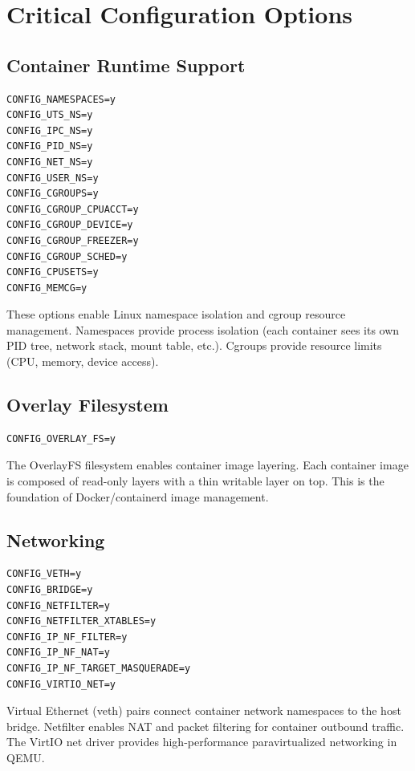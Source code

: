 \section{Critical Configuration Options}

\subsection{Container Runtime Support}

\begin{lstlisting}
CONFIG_NAMESPACES=y
CONFIG_UTS_NS=y
CONFIG_IPC_NS=y
CONFIG_PID_NS=y
CONFIG_NET_NS=y
CONFIG_USER_NS=y
CONFIG_CGROUPS=y
CONFIG_CGROUP_CPUACCT=y
CONFIG_CGROUP_DEVICE=y
CONFIG_CGROUP_FREEZER=y
CONFIG_CGROUP_SCHED=y
CONFIG_CPUSETS=y
CONFIG_MEMCG=y
\end{lstlisting}

These options enable Linux namespace isolation and cgroup resource
management. Namespaces provide process isolation (each container sees
its own PID tree, network stack, mount table, etc.). Cgroups provide
resource limits (CPU, memory, device access).

\subsection{Overlay Filesystem}

\begin{lstlisting}
CONFIG_OVERLAY_FS=y
\end{lstlisting}

The OverlayFS filesystem enables container image layering. Each container
image is composed of read-only layers with a thin writable layer on top.
This is the foundation of Docker/containerd image management.

\subsection{Networking}

\begin{lstlisting}
CONFIG_VETH=y
CONFIG_BRIDGE=y
CONFIG_NETFILTER=y
CONFIG_NETFILTER_XTABLES=y
CONFIG_IP_NF_FILTER=y
CONFIG_IP_NF_NAT=y
CONFIG_IP_NF_TARGET_MASQUERADE=y
CONFIG_VIRTIO_NET=y
\end{lstlisting}

Virtual Ethernet (veth) pairs connect container network namespaces to the
host bridge. Netfilter enables NAT and packet filtering for container
outbound traffic. The VirtIO net driver provides high-performance
paravirtualized networking in QEMU.

